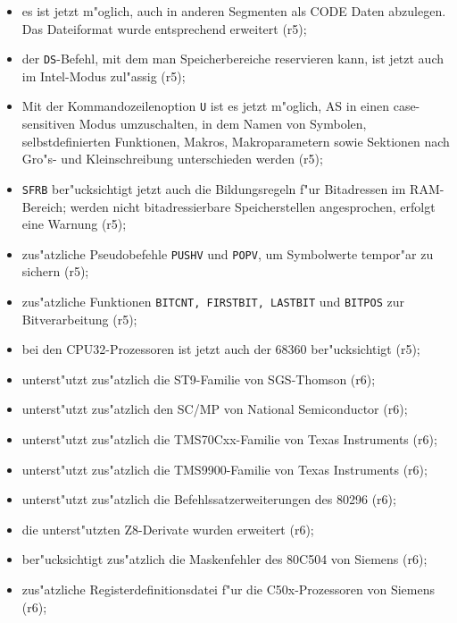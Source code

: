\documentclass[12pt,a4paper,twoside]{report}
\newcommand{\tty}[1]{{\tt #1}}
\begin{document}
{\begin{itemize}
{\begin{itemize}
{                 Gro"s- in Kleinbuchstaben umzuwandeln (r5);}
      \item{es ist jetzt m"oglich, auch in anderen Segmenten als
            CODE Daten abzulegen.  Das Dateiformat wurde entsprechend
            erweitert (r5);}
      \item{der \tty{DS}-Befehl, mit dem man Speicherbereiche reservieren
            kann, ist jetzt auch im Intel-Modus zul"assig (r5);}
      \item{Mit der Kommandozeilenoption \tty{U} ist es jetzt
            m"oglich, AS in einen case-sensitiven Modus umzuschalten,
            in dem Namen von Symbolen, selbstdefinierten Funktionen,
            Makros, Makroparametern sowie Sektionen nach Gro"s-
            und Kleinschreibung unterschieden werden (r5);}
      \item{\tty{SFRB} ber"ucksichtigt jetzt auch die Bildungsregeln 
            f"ur Bitadressen im RAM-Bereich; werden nicht bitadressierbare
            Speicherstellen angesprochen, erfolgt eine Warnung (r5);}
      \item{zus"atzliche Pseudobefehle \tty{PUSHV} und \tty{POPV}, um
            Symbolwerte tempor"ar zu sichern (r5);}
      \item{zus"atzliche Funktionen \tty{BITCNT, FIRSTBIT, LASTBIT} und
                 \tty{BITPOS} zur Bitverarbeitung (r5);}
      \item{bei den CPU32-Prozessoren ist jetzt auch der 68360 
            ber"ucksichtigt (r5);}
      \item{unterst"utzt zus"atzlich die ST9-Familie von SGS-Thomson (r6);}
      \item{unterst"utzt zus"atzlich den SC/MP von National Semiconductor
            (r6);}
      \item{unterst"utzt zus"atzlich die TMS70Cxx-Familie von Texas
            Instruments (r6);}
      \item{unterst"utzt zus"atzlich die TMS9900-Familie von Texas
            Instruments (r6);}
      \item{unterst"utzt zus"atzlich die Befehlssatzerweiterungen
            des 80296 (r6);}
      \item{die unterst"utzten Z8-Derivate wurden erweitert
            (r6);}
      \item{ber"ucksichtigt zus"atzlich die Maskenfehler des 80C504
            von Siemens (r6);}
      \item{zus"atzliche Registerdefinitionsdatei f"ur die C50x-Prozessoren
            von Siemens (r6);}

\end{itemize}}
\end{itemize}}
\end{document}
